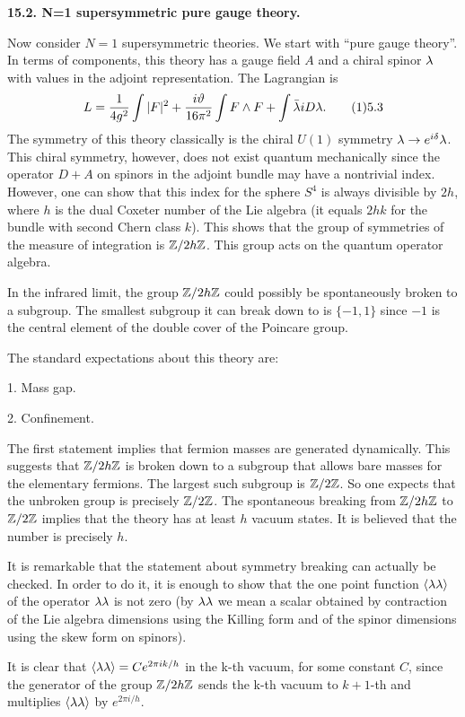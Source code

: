 {\bf 15.2. N=1 supersymmetric pure gauge theory.}

Now consider $N=1$ supersymmetric theories. We start with 
``pure gauge theory''. In terms of components, this theory has 
a gauge field $A$ and a chiral spinor $\lambda$ with values in 
the adjoint representation. 
The Lagrangian is
$$
L=\frac{1}{4g^2}\int |F|^2+
\frac{i\vartheta}{16\pi^2}\int F\wedge F+\int\bar\l iD\l.\tag 15.3 
$$
The symmetry of this theory 
classically is the chiral $U(1)$ symmetry $\lambda\to e^{i\delta}\lambda$. 
This chiral symmetry, however, does not exist quantum mechanically since
the operator $D+A$ on spinors in the adjoint bundle 
may have a nontrivial index. However, one can show that this index 
for the sphere $S^4$ is always divisible by $2h$, where $h$ is the dual 
Coxeter number of the Lie algebra (it equals $2hk$ 
for the bundle with second Chern class $k$). This shows that the group 
of symmetries of the measure of integration is $\Bbb Z/2h\Bbb Z$. 
This group acts on the quantum operator algebra. 

In the infrared limit, the group $\Bbb Z/2h\Bbb Z$ could possibly be spontaneously 
broken to a subgroup. The smallest subgroup it can break down to 
is $\{-1,1\}$ since $-1$ is the central element of the double cover 
of the Poincare group. 

The standard expectations about this theory are:

1. Mass gap. 

2. Confinement. 

The first statement implies that fermion masses are generated dynamically.
This suggests that $\Bbb Z/2h\Bbb Z$ is broken down to a subgroup that allows bare
masses for the elementary fermions.  The largest such subgroup is
$\Bbb Z/2\Bbb Z$. So one expects that the unbroken group is precisely
$\Bbb Z/2\Bbb Z$. The spontaneous breaking from $\Bbb Z/2h\Bbb Z$ to $\Bbb Z/2\Bbb Z$ implies
that the theory has at least $h$ vacuum states.  It is believed that the 
number is precisely $h$.

It is remarkable that the statement about symmetry breaking 
can actually be checked. 
In order to do it, it is enough to show that the one point function 
$\langle\lambda\lambda\rangle$ of the operator $\lambda\lambda$ is not zero (by $\lambda\lambda$ we mean a scalar 
obtained by contraction of the Lie algebra dimensions using the Killing form 
and of the spinor dimensions using the skew form on spinors). 

It is clear that $\langle\lambda\lambda\rangle=Ce^{2\pi ik/h}$ in the k-th vacuum, for some 
constant $C$, 
since the generator of the group $\Bbb Z/2h\Bbb Z$ sends the k-th vacuum to 
$k+1$-th and multiplies $\langle\lambda\lambda\rangle$ by $e^{2\pi i/h}$. 

